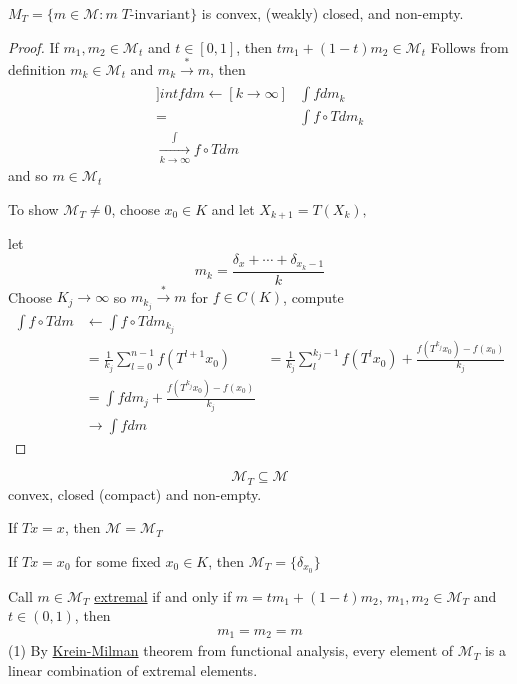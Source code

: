 \begin{theorem}
	$M_{T} = \{ m \in \mathcal{M} : m\; T \text{-invariant} \}$ is convex, (weakly) closed, and non-empty.
\end{theorem}

\begin{proof}
	If $m_1, m_2 \in \mathcal{M}_t$ and $t \in [0,1]$, then
	$t m_1 + (1-t) m_2 \in \mathcal{M}_t$
	Follows from definition
	$m_k \in \mathcal{M}_t$ and $m_k \xrightarrow[]{*} m$, then 
	\begin{align*}
		]int f dm \leftarrow[k \to \infty] &\int f dm_k \\
		= &\int f \circ T dm_k \\
		\xrightarrow[k \to \infty] \int f \circ T dm
	\end{align*} 
	and so $m \in \mathcal{M}_t$

	To show $\mathcal{M}_T \neq 0$, choose $x_0 \in K$ and let $X_{k+1} = T(X_k),$ 

	let  \[
		m_k = \frac{\delta_x + \cdots + \delta_{x_{k} - 1}}{k}
	\] 
	Choose $K_j \to \infty$ so $m_{k_j} \xrightarrow[]{*} m$ for $f \in C(K)$, compute 
	\begin{align*}
		\int f \circ T dm &\leftarrow \int f \circ T dm_{k_j} \\
						  &= \frac{1}{k_j} \sum_{l = 0}^{n-1} f(T^{l+1} x_0 )
						  &= \frac{1}{k_j} \sum_{l}^{k_j - 1} f (T^{l} x_0) + \frac{f (T^{k_j} x_0 ) - f(x_0)}{k_j} \\
						  &= \int f dm_j + \frac{f (T^{k_j} x_0 ) - f(x_0)}{k_j} \\
						  &\rightarrow \int f dm
	\end{align*}
\end{proof}


\[
	\mathcal{M}_T \subseteq \mathcal{M}
\] convex, closed (compact) and non-empty.

\begin{exercise}
	If $T x = x$, then $\mathcal{M} = \mathcal{M}_T$
\end{exercise}

\begin{exercise}
	If $T x = x_0$ for some fixed $x_0 \in K$, then $\mathcal{M}_T = \{ \delta_{x_0} \}$
\end{exercise}


\begin{definition}
	Call $m \in \mathcal{M}_T$ \underline{extremal} if and only if 
	$m = tm_1 + (1-t) m_2$, $m_1, m_2 \in \mathcal{M}_T$ and $t \in (0,1)$, then
	\begin{align}
		m_1 = m_2 = m
	\end{align} 
	(1) By \underline{Krein-Milman} theorem from functional analysis, every element of $\mathcal{M}_T$ is a linear combination of extremal elements.
\end{definition}


